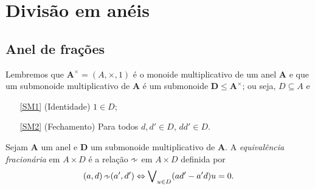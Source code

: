 \section{Divisão em anéis}

\subsection{Anel de frações}

Lembremos que  $\bm A^\times = (A,\times,1)$ é o monoide multiplicativo de um anel $\bm A$ e que um submonoide multiplicativo de $\bm A$ é um submonoide $\bm D \leq \bm A^\times$; ou seja, $D \subseteq A$ e
	\begin{enumerate}
	\item[\ref{SM1}] (Identidade)  $1 \in D$;
	\item[\ref{SM2}] (Fechamento) Para todos $d,d' \in D$, $dd' \in D$.
	\end{enumerate}

\begin{definition}
Sejam $\bm A$ um anel e $\bm D$ um submonoide multiplicativo de $\bm A$. A \emph{equivalência fracionária} em $A \times D$ é a relação $\simfra$ em $A \times D$ definida por
	\begin{equation*}
	(a,d) \simfra (a',d') \Leftrightarrow \exists_{u \in D} (ad'-a'd)u = 0. 
	\end{equation*}
\end{definition}

